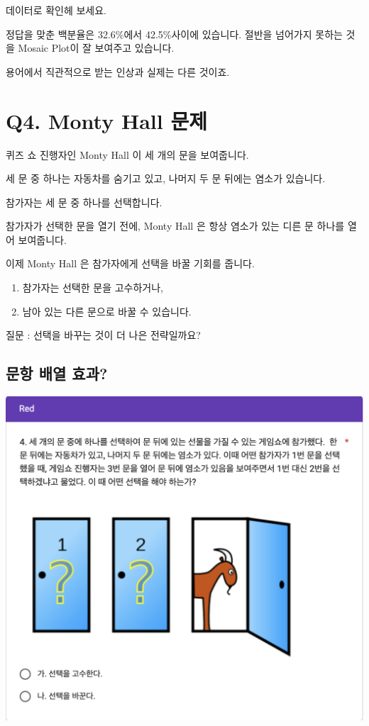 \documentclass[
]{book}
\begin{document}
데이터로 확인헤 보세요.

정답을 맞춘 백분율은 32.6\%에서 42.5\%사이에 있습니다. 절반을 넘어가지 못하는 것을 Mosaic Plot이 잘 보여주고 있습니다.

용어에서 직관적으로 받는 인상과 실제는 다른 것이죠.

\section{Q4. Monty Hall 문제}\label{q4.-monty-hall-uxbb38uxc81c}

퀴즈 쇼 진행자인 Monty Hall 이 세 개의 문을 보여줍니다.

세 문 중 하나는 자동차를 숨기고 있고, 나머지 두 문 뒤에는 염소가 있습니다.

참가자는 세 문 중 하나를 선택합니다.

참가자가 선택한 문을 열기 전에, Monty Hall 은 항상 염소가 있는 디른 문 하나를 열어 보여줍니다.

이제 Monty Hall 은 참가자에게 선택을 바꿀 기회를 줍니다.

\begin{enumerate}
\def\labelenumi{\arabic{enumi}.}
\item
  참가자는 선택한 문을 고수하거나,
\item
  남아 있는 다른 문으로 바꿀 수 있습니다.
\end{enumerate}

질문 : 선택을 바꾸는 것이 더 나은 전략일까요?

\subsection{문항 배열 효과?}\label{uxbb38uxd56d-uxbc30uxc5f4-uxd6a8uxacfc}

\includegraphics[width=0.75\linewidth]{./pics/Quiz240524_Q4_Red}
\end{document}
